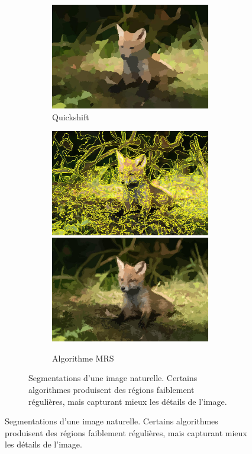 \begin{figure}
\begin{subfigure}{\textwidth}
\begin{subfigure}{0.25\textwidth}
    \includegraphics[width=\textwidth]{Chapitre2/fox_quickshift_patchwork}
    \caption*{Quickshift}
\end{subfigure}%
\begin{subfigure}{0.25\textwidth}
    \includegraphics[width=\textwidth]{Chapitre2/fox_ecognition}
    \includegraphics[width=\textwidth]{Chapitre2/fox_ecognition_patchwork}
    \caption*{Algorithme MRS}
\end{subfigure}
\caption{Segmentations d'une image naturelle. Certains algorithmes produisent des régions faiblement régulières, mais capturant mieux les détails de l'image.}
\label{fig:fox_segmentation}
\end{subfigure}


\end{figure}

